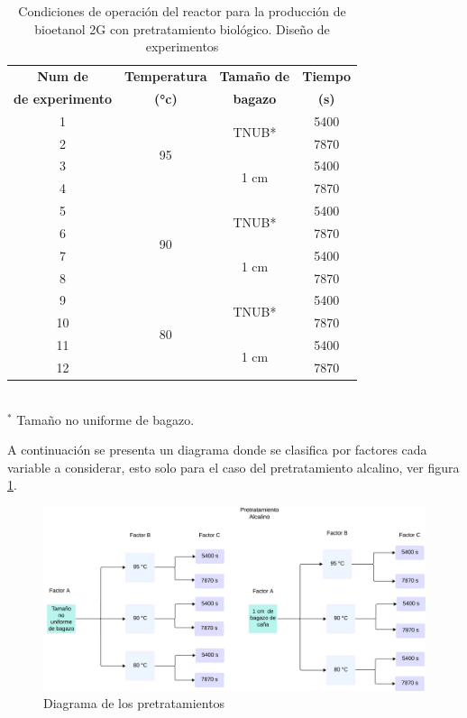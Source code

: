 \documentclass[12pt]{article}
\begin{document}
\begin{table}[H]
	\centering
	\caption{Condiciones de operación del reactor para la producción de bioetanol 2G con pretratamiento biológico. Diseño de experimentos}
	\begin{tabular}{|c|c|c|c|}
		\hline
		\textbf{Num de} & \textbf{Temperatura} & \textbf{Tamaño de } & \textbf{Tiempo} \\ 
		\textbf{de experimento}	&\textbf{ (°c)}&\textbf{ bagazo}  &\textbf{(s)}	\\ \hline
		1 & \multirow{4}{*}{95} & \multirow{2}{*}{TNUB*} & 5400   \\ \cline{1-1} \cline{4-4}
		2 &  &  & 7870  \\ \cline{3-4}  \cline{1-1} 
		3 &  & \multirow{2}{*}{1 cm} & 5400  \\  \cline{1-1} \cline{4-4}
		4 &  &  & 7870  \\ \cline{1-1}  \hline
		5 & \multirow{4}{*}{90}& \multirow{2}{*}{TNUB*} & 5400  \\ \cline{1-1}  \cline{4-4}
		6 &  &  & 7870   \\ \cline{1-1} \cline{3-4}
		7 &  & \multirow{2}{*}{1 cm} & 5400  \\ \cline{1-1}\cline{4-4}
		8 &  &  & 7870 \\ \hline
		9 & \multirow{4}{*}{80} & \multirow{2}{*}{TNUB*} & 5400  \\ \cline{1-1}\cline{4-4}
		10 &  &  & 7870   \\ \cline{1-1} \cline{3-4}
		11 &  &\multirow{2}{*}{1 cm} & 5400 \\ \cline{1-1}\cline{4-4}
		12 &  &  & 7870  \\ \hline
	\end{tabular}
		\\[3 pt] %
	\footnotesize{$^{*}$  Tamaño no uniforme de bagazo.}
\end{table}



A continuación se presenta un diagrama donde se clasifica por factores cada variable a considerar, esto solo para el caso del pretratamiento alcalino, ver figura  \ref{Diagrama1}.



\begin{figure} [H]
	\centering
	\includegraphics[width=0.9\linewidth]{imagenes/Diagrama alcalino}
	\caption{Diagrama de los pretratamientos}
	\label{Diagrama1}
\end{figure}
\end{document}
